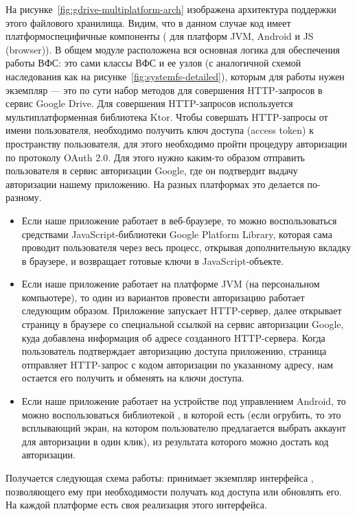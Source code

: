     На рисунке~\ref{fig:gdrive-multiplatform-arch} изображена архитектура поддержки этого файлового хранилища. Видим, что в данном случае код имеет платформоспецифичные компоненты ( для платформ JVM, Android и JS (browser)). В общем модуле расположена вся основная логика для обеспечения работы ВФС: это сами классы ВФС и ее узлов (с аналогичной схемой наследования как на рисунке~\ref{fig:systemfs-detailed}), которым для работы нужен экземпляр  --- это по сути набор методов для совершения HTTP-запросов в сервис Google Drive. Для совершения HTTP-запросов используется мультиплатформенная библиотека Ktor. Чтобы совершать HTTP-запросы от имени пользователя, необходимо получить ключ доступа (access token) к пространству пользователя, для этого необходимо пройти процедуру авторизации по протоколу OAuth 2.0\cite{google-oauth-2.0}. Для этого нужно каким-то образом отправить пользователя в сервис авторизации Google, где он подтвердит выдачу авторизации нашему приложению. На разных платформах это делается по-разному.
    \begin{itemize}
      \item Если наше приложение работает в веб-браузере, то можно воспользоваться средствами JavaScript-библиотеки Google Platform Library, которая сама проводит пользователя через весь процесс, открывая дополнительную вкладку в браузере, и возвращает готовые ключи в JavaScript-объекте.
      \item Если наше приложение работает на платформе JVM (на персональном компьютере), то один из вариантов провести авторизацию работает следующим образом. Приложение запускает HTTP-сервер, далее открывает страницу в браузере со специальной ссылкой на сервис авторизации Google, куда добавлена информация об адресе созданного HTTP-сервера. Когда пользователь подтверждает авторизацию доступа приложению, страница отправляет HTTP-запрос с кодом авторизации по указанному адресу, нам остается его получить и обменять на ключи доступа.
      \item Если наше приложение работает на устройстве под управлением Android, то можно воспользоваться библиотекой , в которой есть  (если огрубить, то это всплывающий экран, на котором пользователю предлагается выбрать аккаунт для авторизации в один клик), из результата которого можно достать код авторизации.
    \end{itemize}

    Получается следующая схема работы:  принимает экземпляр интерфейса , позволяющего ему при необходимости получать код доступа или обновлять его. На каждой платформе есть своя реализация этого интерфейса.

